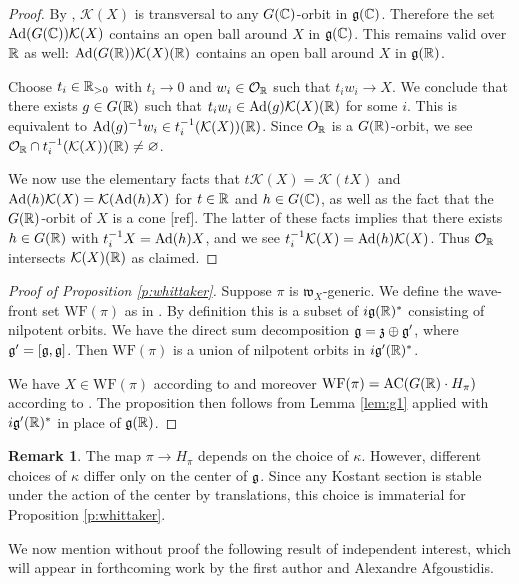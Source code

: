 \documentclass{article}
\theoremstyle{definition}
\newtheorem{rem}[thm]{Remark}
\numberwithin{equation}{section}
\renewcommand{\-}{\hyp{}}
\newcommand{\warn}[1]{{\leavevmode\color{red}[#1]}}
\newcommand{\g}{\mathfrak g}
\renewcommand{\O}{\mathcal O}
\newcommand{\K}{\mathcal K}
\newcommand{\w}{\mathfrak w}
\newcommand{\WF}{\mathrm{WF}}
\newcommand{\AC}{\mathrm{AC}}
\begin{document}
\begin{proof}
By \cite{Kos63}, $\K(X)$ is transversal to any $G(\mathbb{C})$-orbit in $\g(\C)$. Therefore the set $\tx{Ad}(G(\C))\K(X)$ contains an open ball around $X$ in $\g(\C)$. This remains valid over $\mathbb{R}$ as well: $\tx{Ad}(G(\R))\K(X)(\R)$ contains an open ball around $X$ in $\g(\R)$.

Choose $t_i \in \mathbb{R}_{>0}$ with $t_i \to 0$ and $w_i \in \O_\R$ such that $t_iw_i \to X$. We conclude that there exists $g \in G(\mathbb{R})$ such that $t_iw_i \in \tx{Ad}(g)\K(X)(\R)$ for some $i$. This is equivalent to $\tx{Ad}(g)^{-1}w_i \in t_i^{-1}(\K(X))(\R)$. Since $O_{\mathbb{R}}$ is a $G(\mathbb{R})$-orbit, we see $\O_\R \cap t_i^{-1}(\K(X))(\R) \neq \varnothing$. 

We now use the elementary facts that $t\K(X)=\K(tX)$ and $\tx{Ad}(h)\K(X)=\K(\tx{Ad}(h)X)$ for $t \in \mathbb{R}$ and $h \in G(\mathbb{C})$, as well as the fact that the $G(\mathbb{R})$-orbit of $X$ is a cone \warn{ref}. The latter of these facts implies that there exists $h \in G(\mathbb{R})$ with $t_i^{-1}X=\textrm{Ad}(h)X$, and we see $t_i^{-1}\K(X)=\tx{Ad}(h)\K(X)$. Thus $\O_\R$ intersects $\K(X)(\R)$ as claimed.
\end{proof}

\begin{proof}[Proof of Proposition \ref{p:whittaker}]

Suppose $\pi$ is $\w_X$-generic.
	We define the wave-front set $\WF(\pi)$ as in \cite[Section 3]{matumoto}. By definition this is a subset of $i\g(\R)^*$ consisting of nilpotent orbits. We have the direct sum decomposition $\g = \mf{z} \oplus \mf{g}'$, where $\mathfrak{g}'=[\mathfrak{g},\mathfrak{g}]$. Then $\WF(\pi)$ is a union of nilpotent orbits in $i\g'(\R)^*$.
	
	We have $X\in \WF(\pi)$ according to \cite[Theorem A]{matumoto} and moreover $\WF(\pi)=\AC(G(\R)\cdot H_\pi)$ according to \cite[Theorem 1.2]{harris}. The proposition then follows from Lemma \ref{lem:g1} applied with $i\g'(\R)^*$ in place of $\g(\R)$.
\end{proof}


\begin{rem}
  The map $\pi\rightarrow H_\pi$ depends on the choice of $\kappa$. However, different choices of $\kappa$ differ only on the center of $\mathfrak{g}$. Since any Kostant section is stable under the action of the center by translations, this choice is immaterial for Proposition \ref{p:whittaker}.
\end{rem}

We now mention without proof the following result of independent interest, which will appear in forthcoming work by the first author and Alexandre Afgoustidis.
\end{document}
